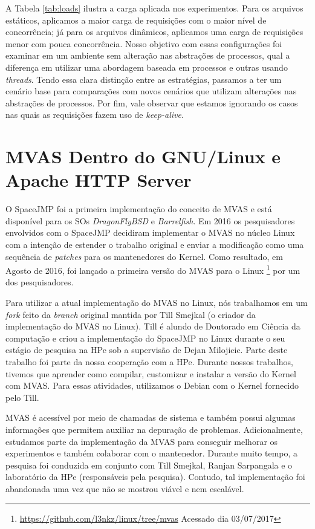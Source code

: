 

A Tabela \ref{tab:loads} ilustra a carga aplicada nos experimentos. Para os
arquivos estáticos, aplicamos a maior carga de requisições com o maior
nível de concorrência; já para os arquivos dinâmicos, aplicamos uma carga
de requisições menor com pouca concorrência. Nosso objetivo com essas
configurações foi examinar em um ambiente sem alteração nas abstrações de
processos, qual a diferença em utilizar uma abordagem baseada em processos e
outras usando \emph{threads}. Tendo essa clara distinção entre as estratégias,
passamos a ter um cenário base para comparações com novos cenários que utilizam
alterações nas abstrações de processos. Por fim, vale observar que estamos
ignorando os casos nas quais as requisições fazem uso de \emph{keep-alive}.

\section{MVAS Dentro do GNU/Linux e Apache HTTP Server}
\label{sec:mvas_inside_httpd}

O SpaceJMP \citep{spacejmp} foi a primeira implementação do conceito de MVAS e
está disponível para os SOs \emph{DragonFlyBSD} e \emph{Barrelfish}. Em 2016 os pesquisadores
envolvidos com o SpaceJMP decidiram implementar o MVAS no núcleo Linux com a
intenção de estender o trabalho original e enviar a modificação como uma
sequência de \emph{patches} para os mantenedores do Kernel. Como resultado, em
Agosto de 2016, foi lançado a primeira versão do MVAS para o Linux
\footnote{\url{https://github.com/l3nkz/linux/tree/mvas} Acessado dia 03/07/2017} por
um dos pesquisadores.
 
Para utilizar a atual implementação do MVAS no Linux, nós trabalhamos em um
\emph{fork} feito da \emph{branch} original mantida por Till Smejkal (o criador
da implementação do MVAS no Linux). Till é alundo de Doutorado em Ciência da
computação e criou a implementação do SpaceJMP no Linux durante o seu estágio
de pesquisa na HPe sob a supervisão de Dejan Milojicic. Parte deste trabalho
foi parte da nossa cooperação com a HPe. Durante nossos trabalhos, tivemos que
aprender como compilar, customizar e instalar a versão do Kernel com MVAS. Para
essas atividades, utilizamos o Debian com o Kernel fornecido pelo Till.

MVAS é acessível por meio de chamadas de sistema e também possui algumas
informações que permitem auxiliar na depuração de problemas. Adicionalmente,
estudamos parte da implementação da MVAS para conseguir melhorar os
experimentos e também colaborar com o mantenedor. Durante muito tempo, a
pesquisa foi conduzida em conjunto com Till Smejkal, Ranjan Sarpangala e o
laboratório da HPe (responsáveis pela pesquisa). Contudo, tal implementação foi
abandonada uma vez que não se mostrou viável e nem escalável.
 
